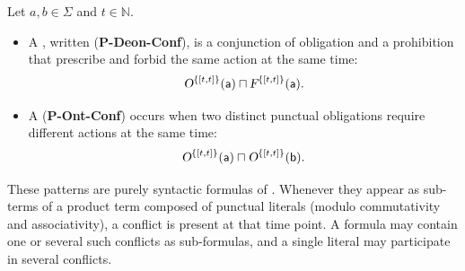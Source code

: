 \begin{definition}\label{puncttypes}
Let $a,b\in\Sigma$ and $t\in\mathbb{N}$.
\begin{itemize}
    \item A , written (\textbf{P-Deon-Conf}), is a  conjunction of obligation and a prohibition that prescribe and forbid the same action at the same time:
    \[
        \textsl{O}^{\{[t,t]\}}(\mathsf{a}) \sqcap \textsl{F}^{\{[t,t]\}}(\mathsf{a}).
    \]
    \item A  (\textbf{P-Ont-Conf}) occurs when two distinct punctual obligations require different actions at the same time:
    \[
        \textsl{O}^{\{[t,t]\}}(\mathsf{a}) \sqcap \textsl{O}^{\{[t,t]\}}(\mathsf{b}).
    \]
\end{itemize}
\end{definition}

These patterns are purely syntactic formulas of \TDDLfm. Whenever they appear as sub-terms of a product term composed of punctual literals (modulo commutativity and associativity), a conflict is present at that time point. A formula may contain one or several such conflicts as sub-formulas, and a single literal may participate in several conflicts.

